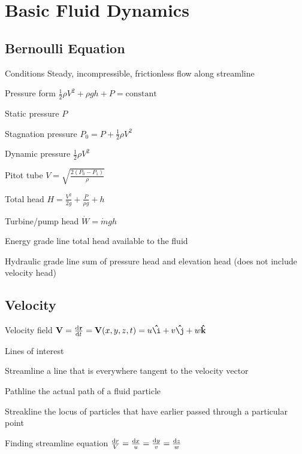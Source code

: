\documentclass{article}
\begin{document}
\section{Basic Fluid Dynamics}

\subsection{Bernoulli Equation}
\begin{description*}
\item[Conditions] Steady, incompressible, frictionless flow along streamline
\item[Pressure form]
  \(\frac{1}{2}\rho V^2 + \rho g h + P = \text{constant}\)
\item[Static pressure]
  \(P\)
\item[Stagnation pressure]
  \(P_0 = P + \frac{1}{2}\rho V^2\)
\item[Dynamic pressure]
  \(\frac{1}{2}\rho V^2\)
\item[Pitot tube]
  \(V = \sqrt{\frac{2\left(P_0-P_1\right)}{\rho}}\)
\item[Total head]
  \(H = \frac{V^2}{2g} + \frac{P}{\rho g} + h\)
\item[Turbine\slash{}pump head]
  \(\dot{W} = \dot{m} g h\)
\item[Energy grade line] total head available to the fluid
\item[Hydraulic grade line] sum of pressure head and elevation head (does not include velocity head)
\end{description*}

\subsection{Velocity}
\begin{description*}
\item[Velocity field]
  \(\vec{V} = \od{\vec{r}}{t} = \vec{V}(x,y,z,t) = u\uvec{\i}+v\uvec{\j} + w\uvec{k}\)
\item[Lines of interest]~
  \begin{description*}
  \item[Streamline] a line that is everywhere tangent to the velocity vector
  \item[Pathline] the actual path of a fluid particle
  \item[Streakline] the locus of particles that have earlier passed through a particular point
  \end{description*}
\item[Finding streamline equation]
  \(\frac{\dif r}{V} = \frac{\dif x}{u} = \frac{\dif y}{v} = \frac{\dif z}{w}\)
\end{description*}
\end{document}
